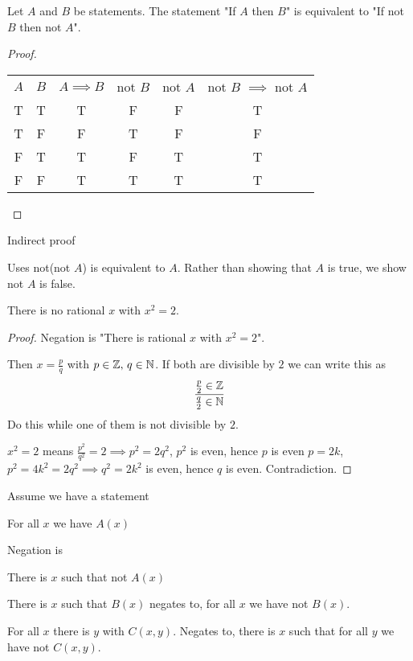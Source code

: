 \documentclass[10pt, a4paper]{article}
\begin{document}
\begin{theorem}
    Let $A$ and $B$ be statements. The statement "If $A$ then $B$" is equivalent to "If not $B$ then not $A$".
    \begin{proof}
        \begin{table}[h!]
            \centering
            \begin{tabular}{cccccc}
                $A$ & $B$ & $A \implies B$ & not $B$ & not $A$ & not $B$ $\implies$ not $A$ \\
                 T & T & T & F & F & T \\
                 T & F & F & T & F & F \\
                 F & T & T & F & T & T \\
                 F & F & T & T & T & T \\
            \end{tabular}
        \end{table}
    \end{proof}
\end{theorem}

Indirect proof

Uses not(not $A$) is equivalent to $A$. Rather than showing that $A$ is true, we show not $A$ is false.
\begin{example}
    There is no rational $x$ with $x ^ 2 = 2$.
    \begin{proof}
        Negation is "There is rational $x$ with $x ^ 2 = 2$".

        Then $x = \frac{p}{q}$ with $p \in \mathbb{Z},\, q \in \mathbb{N}$. If both are divisible by $2$ we can write this as
        \[
        \frac{\frac{p}{2} \in \mathbb{Z}}{\frac{q}{2} \in \mathbb{N}}
        \]
        Do this while one of them is not divisible by $2$.

        $x ^ 2 = 2$ means $\frac{p ^ 2}{q ^ 2} = 2 \implies p ^ 2 = 2q ^ 2$, $p ^ 2$ is even, hence $p$ is even $p = 2k$, $p ^ 2 = 4k ^ 2 = 2q ^ 2 \implies q ^ 2 = 2k ^ 2$ is even, hence $q$ is even. Contradiction.
    \end{proof}
\end{example}

Assume we have a statement

For all $x$ we have $A(x)$

Negation is

There is $x$ such that not $A(x)$

There is $x$ such that $B(x)$ negates to, for all $x$ we have not $B(x)$.

For all $x$ there is $y$ with $C(x, y)$. Negates to, there is $x$ such that for all $y$ we have not $C(x, y)$.
\end{document}
